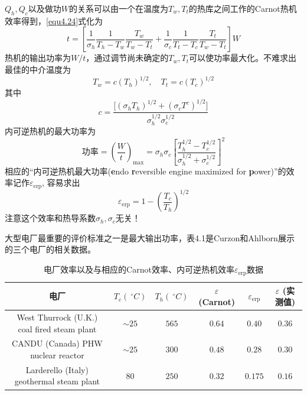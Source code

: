 $Q_h, Q_c$以及做功$W$的关系可以由一个在温度为$T_w, T_t$的热库之间工作的Carnot热机效率得到，\eqref{equ4.24}式化为
\begin{equation}
	t = \left[ \frac{1}{\sigma_h} \frac{1}{T_h - T_w} \frac{T_w}{T_w - T_t} + \frac{1}{\sigma_c} \frac{1}{T_t - T_c} \frac{T_t}{T_w - T_t} \right] W 
\label{equ4.25}
\end{equation}
热机的输出功率为$W/t$，通过调节尚未确定的$T_w, T_t$可以使功率最大化。不难求出最佳的中介温度为
\begin{equation}
	T_w = c (T_h)^{1/2}, \quad T_t = c(T_c)^{1/2}
\label{equ4.26}
\end{equation}
其中 
\begin{equation}
	c = \frac{ \Big[ (\sigma_h T_h)^{1/2} + (\sigma_c T^c)^{1/2} \Big] }{ \sigma_h^{1/2} \sigma_c^{1/2} }
\label{equ4.27}
\end{equation}
内可逆热机的最大功率为
\begin{equation}
	\text{功率} = \left( \frac{W}{t} \right)_{\text{max}} = \sigma_h \sigma_c \left[ \frac{T_h^{1/2} - T_c^{1/2} }{ \sigma_h^{1/2} + \sigma_c^{1/2} } \right]^2
\label{equ4.28}
\end{equation}
相应的“内可逆热机最大功率({\bf e}ndo {\bf r}eversible  engine maximized for {\bf p}ower)”的效率记作$\varepsilon_{\text{erp}}$, 容易求出
\begin{equation}
	\varepsilon_{\text{erp}} = 1 - \left( \frac{T_c}{T_h} \right)^{1/2}
\label{equ4.29}
\end{equation}
注意这个效率和热导系数$\sigma_h, \sigma_c$无关！

大型电厂最重要的评价标准之一是最大输出功率，表4.1是Curzon和Ahlborn展示的三个电厂的相关数据。

\begin{table}[h]

\caption{电厂效率以及与相应的Carnot效率、内可逆热机效率$\varepsilon_{\text{erp}}$数据}
\begin{tabular}{c c c c c c}
\toprule
\textbf{电厂} & $T_c (\ ^\circ C)$ & $T_h (\ ^\circ C)$ & $\varepsilon$ (Carnot) & $\varepsilon_{\text{erp}}$ & $\varepsilon$ (实测值) \\
\midrule
West Thurrock  (U.K.)  coal fired steam plant & $\sim 25$ & $565$ & $0.64$ & $0.40$ & 0.36 \\
CANDU (Canada) PHW nuclear reactor & $\sim 25$ & $300$ & $0.48$ & $0.28$ & $0.30$ \\
Larderello (Italy) geothermal steam plant & $80$ & $250$ & $0.32$ & $0.175$ & $0.16$ \\
\bottomrule
\end{tabular}
\end{table}

